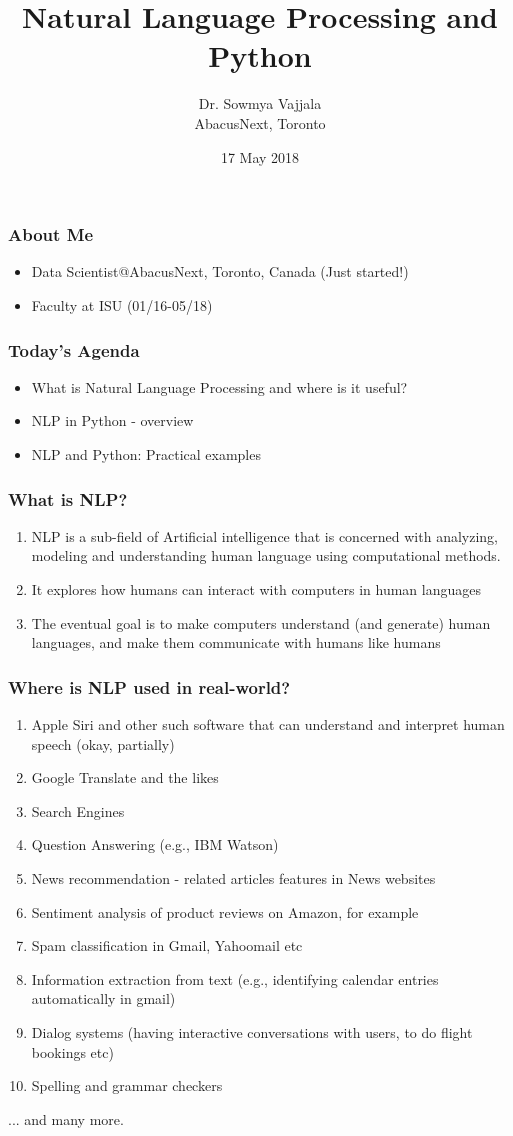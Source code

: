 \documentclass{beamer}
\author[Sowmya Vajjala]{Dr. Sowmya Vajjala \\ AbacusNext, Toronto}
\title[MBDS2018Talk]{Natural Language Processing and Python}
\date{17 May 2018}
\institute{Big Data Applications track@Mid-west Big Data Summer School \\
Iowa State University, USA}
\begin{document}
\begin{frame}\titlepage
\end{frame}

\begin{frame}
\frametitle{About Me}
\begin{itemize}
\item Data Scientist@AbacusNext, Toronto, Canada (Just started!)
\item Faculty at ISU (01/16-05/18)
\end{itemize}
\end{frame}

\begin{frame}
\frametitle{Today's Agenda}
\begin{itemize}
\item What is Natural Language Processing and where is it useful?
\item NLP in Python - overview 
\item NLP and Python: Practical examples
\end{itemize}
\end{frame}

\begin{frame}
\frametitle{What is NLP?}
\begin{enumerate}
\item NLP is a sub-field of Artificial intelligence that is concerned with analyzing, modeling and understanding human language using computational methods. 
\item It explores how humans can interact with computers in human languages
\item The eventual goal is to make computers understand (and generate) human languages, and make them communicate with humans like humans
\end{enumerate}
\end{frame}

\begin{frame}
\frametitle{Where is NLP used in real-world?}
\begin{enumerate}
\item Apple Siri and other such software that can understand and interpret human speech (okay, partially)
\item Google Translate and the likes
\item Search Engines
\item Question Answering (e.g., IBM Watson)
\item News recommendation - related articles features in News websites
\item Sentiment analysis of product reviews on Amazon, for example
\item Spam classification in Gmail, Yahoomail etc
\item Information extraction from text (e.g., identifying calendar entries automatically in gmail)
\item Dialog systems (having interactive conversations with users, to do flight bookings etc)
\item Spelling and grammar checkers
\end{enumerate}
... and many more. 
\end{frame}
\end{document}
